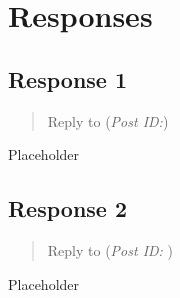 \documentclass[12pt]{article}
\begin{document}
  \newpage
  \section{Responses}

    \subsection{Response 1}
      \begin{quote}
        Reply to \textbf{} (\textit{Post ID:})
      \end{quote}
      Placeholder

    \subsection{Response 2}
      \begin{quote}
        Reply to \textbf{} (\textit{Post ID: }) 
      \end{quote}
      Placeholder


  \newpage
  \printbibliography[
    heading=bibintoc,
    title={Works Cited}
  ]
\end{document}
